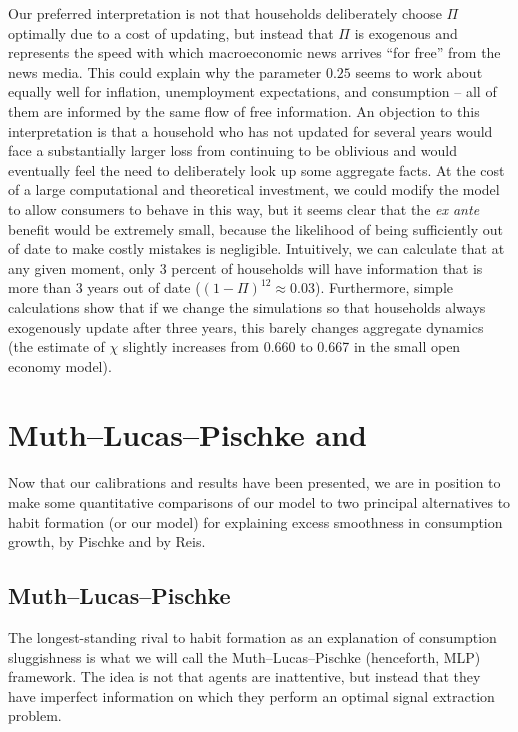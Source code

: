 \documentclass[titlepage]{article}
\begin{document}
Our preferred interpretation is not that households deliberately choose $\Pi$ optimally due to a cost of updating, but instead that $\Pi$ is exogenous and represents the speed with which macroeconomic news arrives ``for free'' from the news media.  This could explain why the parameter $0.25$ seems to work about equally well for inflation, unemployment expectations, and consumption -- all of them are informed by the same flow of free information. An objection to this interpretation is that a household who has not updated for several years would face a substantially larger loss from continuing to be oblivious and would eventually feel the need to deliberately look up some aggregate facts.  At the cost of a large computational and theoretical investment, we could modify the model to allow consumers to behave in this way, but it seems clear that the {\it ex ante} benefit would be extremely small, because the likelihood of being sufficiently out of date to make costly mistakes is negligible.  Intuitively, we can calculate that at any given moment, only 3 percent of households will have information that is more than 3 years out of date ($(1-\Pi)^{12} \approx 0.03$).  Furthermore, simple calculations show that if we change the simulations so that households always exogenously update after three years, this barely changes aggregate dynamics (the estimate of $\chi$ slightly increases from 0.660 to 0.667 in the small open economy model).

\section{Muth--Lucas--Pischke and \cite{reis:inattentive}} \label{sec:Comparisons}

Now that our calibrations and results have been presented, we are in position to make some quantitative comparisons of our model to two principal alternatives to habit formation (or our model) for explaining excess smoothness in consumption growth, by Pischke and by Reis.

\subsection{Muth--Lucas--Pischke}
The longest-standing rival to habit formation as an explanation of consumption sluggishness is what we will call the Muth--Lucas--Pischke (henceforth, MLP) framework.  The idea is not that agents are inattentive, but instead that they have imperfect information on which they perform an optimal signal extraction problem.
\end{document}
